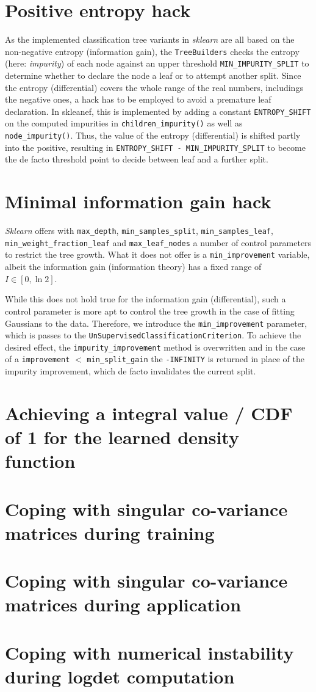 \documentclass[10pt,a4paper]{article}
\begin{document}
\section{Positive entropy hack}
As the implemented classification tree variants in \textit{sklearn} are all based on the non-negative entropy (information gain), the \texttt{TreeBuilders} checks the entropy (here: \textit{impurity}) of each node against an upper threshold \texttt{MIN\_IMPURITY\_SPLIT} to determine whether to declare the node a leaf or to attempt another split.
Since the entropy (differential) covers the whole range of the real numbers, includings the negative ones, a hack has to be employed to avoid a premature leaf declaration. In skleanef, this is implemented by adding a constant \texttt{ENTROPY\_SHIFT} on the computed impurities in
\texttt{children\_impurity()} as well as \texttt{node\_impurity()}. Thus, the value of the entropy (differential) is shifted partly into the positive, resulting in \texttt{ENTROPY\_SHIFT -  MIN\_IMPURITY\_SPLIT} to become the de facto threshold point to decide between leaf and a further split.

\section{Minimal information gain hack}
\textit{Sklearn} offers with \texttt{max\_depth}, \texttt{min\_samples\_split}, \texttt{min\_samples\_leaf}, \texttt{min\_weight\_fraction\_leaf} and \texttt{max\_leaf\_nodes} a number of control parameters to restrict the tree growth. What it does not offer is a \texttt{min\_improvement} variable, albeit the information gain (information theory) has a fixed range of $I \in [0, \ln 2]$.

While this does not hold true for the information gain (differential), such a control parameter is more apt to control the tree growth in the case of fitting Gaussians to the data. Therefore, we introduce the \texttt{min\_improvement} parameter, which is passes to the \texttt{UnSupervisedClassificationCriterion}. To achieve the desired effect, the \texttt{impurity\_improvement} method is overwritten and in the case of a \texttt{improvement} $<$ \texttt{min\_split\_gain} the \texttt{-INFINITY} is returned in place of the impurity improvement, which de facto invalidates the current split.

\section{Achieving a integral value / CDF of 1 for the learned density function}

\section{Coping with singular co-variance matrices during training}

\section{Coping with singular co-variance matrices during application}

\section{Coping with numerical instability during logdet computation}
\end{document}
